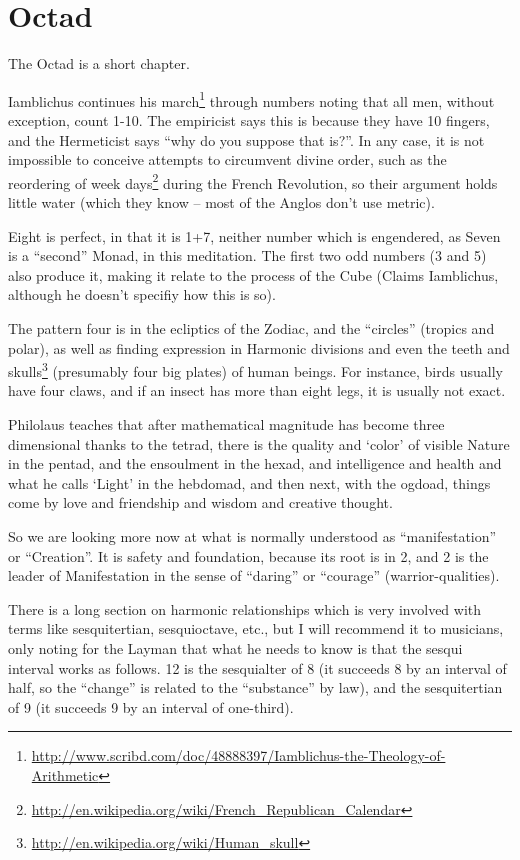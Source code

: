 \section{Octad}

The Octad is a short chapter.

Iamblichus continues his march\footnote{\url{http://www.scribd.com/doc/48888397/Iamblichus-the-Theology-of-Arithmetic}} through numbers noting that all men, without exception, count 1-10. The empiricist says this is because they have 10 fingers, and the Hermeticist says ``why do you suppose that is?''. In any case, it is not impossible to conceive attempts to circumvent divine order, such as the reordering of week days\footnote{\url{http://en.wikipedia.org/wiki/French_Republican_Calendar}} during the French Revolution, so their argument holds little water (which they know -- most of the Anglos don't use metric).

Eight is perfect, in that it is 1+7, neither number which is engendered, as Seven is a ``second'' Monad, in this meditation. The first two odd numbers (3 and 5) also produce it, making it relate to the process of the Cube (Claims Iamblichus, although he doesn't specifiy how this is so).

The pattern four is in the ecliptics of the Zodiac, and the ``circles'' (tropics and polar), as well as finding expression in Harmonic divisions and even the teeth and skulls\footnote{\url{http://en.wikipedia.org/wiki/Human_skull}} (presumably four big plates) of human beings. For instance, birds usually have four claws, and if an insect has more than eight legs, it is usually not exact.

\begin{quotex}
Philolaus teaches that after mathematical magnitude has become three dimensional thanks to the tetrad, there is the quality and `color' of visible Nature in the pentad, and the ensoulment in the hexad, and intelligence and health and what he calls `Light' in the hebdomad, and then next, with the ogdoad, things come by love and friendship and wisdom and creative thought.
\end{quotex}


So we are looking more now at what is normally understood as ``manifestation'' or ``Creation''. It is safety and foundation, because its root is in 2, and 2 is the leader of Manifestation in the sense of ``daring'' or ``courage'' (warrior-qualities).

There is a long section on harmonic relationships which is very involved with terms like sesquitertian, sesquioctave, etc., but I will recommend it to musicians, only noting for the Layman that what he needs to know is that the sesqui interval works as follows. 12 is the sesquialter of 8 (it succeeds 8 by an interval of half, so the ``change'' is related to the ``substance'' by law), and the sesquitertian of 9 (it succeeds 9 by an interval of one-third).

